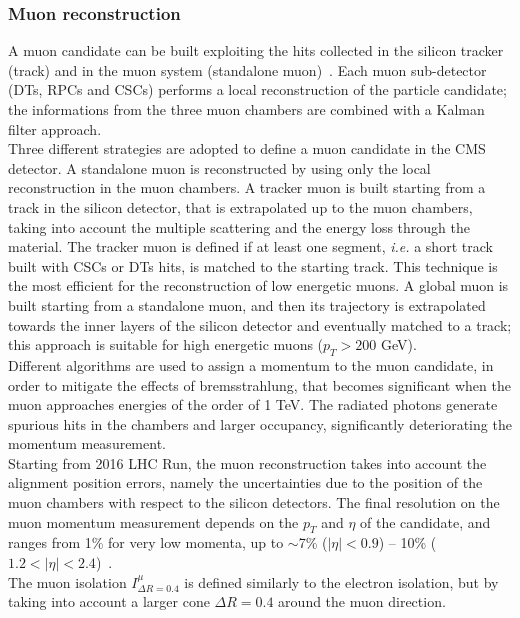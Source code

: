 \subsubsection{Muon reconstruction}
A muon candidate can be built exploiting the hits collected in the silicon tracker (track) and in the muon system (standalone muon)~\cite{Chatrchyan:2012xi}. Each muon sub-detector (DTs, RPCs and CSCs) performs a local reconstruction of the particle candidate; the informations from the three muon chambers are combined with a Kalman filter approach.\\
Three different strategies are adopted to define a muon candidate in the CMS detector. A standalone muon is reconstructed by using only the local reconstruction in the muon chambers. A tracker muon is built starting from a track in the silicon detector, that is extrapolated up to the muon chambers, taking into account the multiple scattering and the energy loss through the material. The tracker muon is defined if at least one segment, \textit{i.e.} a short track built with CSCs or DTs hits, is matched to the starting track. This technique is the most efficient for the reconstruction of low energetic muons. A global muon is built starting from a standalone muon, and then its trajectory is extrapolated towards the inner layers of the silicon detector and eventually matched to a track; this approach is suitable for high energetic muons ($p_T>200$ GeV).\\
Different algorithms are used to assign a momentum to the muon candidate, in order to mitigate the effects of bremsstrahlung, that becomes significant when the muon approaches energies of the order of 1 TeV. The radiated photons generate spurious hits in the chambers and larger occupancy, significantly deteriorating the momentum measurement.\\
Starting from 2016 LHC Run, the muon reconstruction takes into account the alignment position errors, namely the uncertainties due to the position of the muon chambers with respect to the silicon detectors. The final resolution on the muon momentum measurement depends on the $p_T$ and $\eta$ of the candidate, and ranges from 1\% for very low momenta, up to $\sim$7\% ($|\eta|<0.9$) -- 10\% ($1.2 < |\eta| < 2.4$)~\cite{CMS-DP-2016-067}.\\
The muon isolation $I_{\Delta R = 0.4}^{\mu}$ is defined similarly to the electron isolation, but by taking into account a larger cone $\Delta R = 0.4$ around the muon direction.

